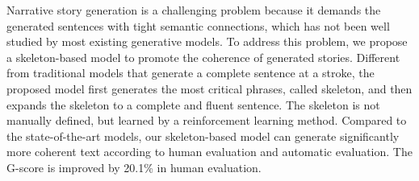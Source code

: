 Narrative story generation is a challenging problem because it demands the generated sentences with tight semantic connections, which has not been well studied by most existing generative models. To address this problem, we propose a  skeleton-based model to promote the coherence of generated stories. Different from traditional models that generate a complete sentence at a stroke, the proposed model first generates the most critical phrases, called skeleton, and then expands the skeleton to a complete and fluent sentence. The skeleton is not manually defined, but learned by a reinforcement learning method. Compared to the state-of-the-art models, our skeleton-based model  can generate significantly more coherent text according to human evaluation and automatic evaluation. The G-score is improved by 20.1\% in human evaluation.
